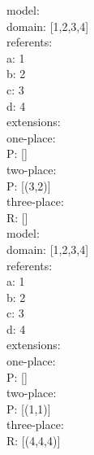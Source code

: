 \documentclass[12pt,a4paper]{article}
\begin{document}
\noindent
model:\\
\hspace*{1em}  domain: [1,2,3,4]\\
\hspace*{1em}  referents: \\
\hspace*{3em} a: 1 \\
\hspace*{3em} b: 2 \\
\hspace*{3em} c: 3 \\
\hspace*{3em} d: 4\\
\hspace*{1em}  extensions:\\
\hspace*{2em}    one-place: \\
\hspace*{4em} P: []\\
\hspace*{2em}    two-place: \\
\hspace*{4em} P: [(3,2)]\\
\hspace*{2em}    three-place: \\
\hspace*{4em} R: []\\

\noindent
model:\\
\hspace*{1em}  domain: [1,2,3,4]\\
\hspace*{1em}  referents: \\
\hspace*{3em} a: 1 \\
\hspace*{3em} b: 2 \\
\hspace*{3em} c: 3 \\
\hspace*{3em} d: 4\\
\hspace*{1em}  extensions:\\
\hspace*{2em}    one-place: \\
\hspace*{4em} P: []\\
\hspace*{2em}    two-place: \\
\hspace*{4em} P: [(1,1)]\\
\hspace*{2em}    three-place: \\
\hspace*{4em} R: [(4,4,4)]\\
\end{document}
